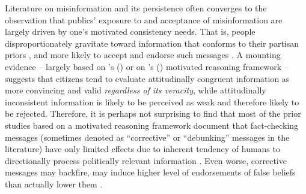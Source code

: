 \documentclass[man, 12pt, a4paper, noextraspace]{apa6}
\begin{document}
      Literature on misinformation and its persistence often converges to the observation that publics' exposure to and acceptance of misinformation are largely driven by one's motivated consistency needs. That is, people disproportionately gravitate toward information that conforms to their partisan priors \parencite{ weeks2014electoral, garrett2016driving}, and  more likely to accept and endorse such messages \parencite{nyhan2010corrections, guess2018selective}. A mounting evidence -- largely based on \citeauthor{kunda1990}'s (\citeyear{kunda1990}) or on \citeauthor{taber2006}'s (\citeyear{taber2006}) motivated reasoning framework -- suggests that citizens tend to evaluate attitudinally congruent information as more convincing and valid \emph{regardless of its veracity}, while attitudinally inconsistent information is likely to be perceived as weak and therefore likely to be rejected. Therefore, it is perhaps not surprising to find that most of the prior studies based on a motivated reasoning framework document that fact-checking messages (sometimes denoted as \enquote{corrective} or \enquote{debunking} messages in the literature) have only limited effects due to inherent tendency of humans to directionally process politically relevant information \parencite{thorson_2016, taber2006,flynn2017nature}. Even worse, corrective messages may backfire, may induce higher level of endorsements of false beliefs than actually lower them \parencites[e.g.,][]{nyhan2010corrections}[but see][]{Wood2018}.
      
\end{document}
